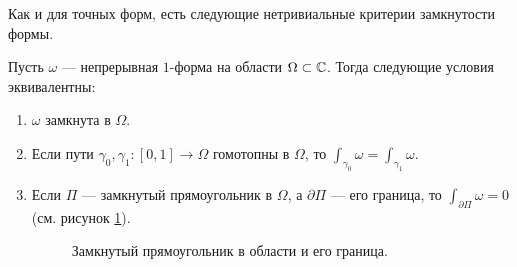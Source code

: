 \documentclass[../complex-analysis.tex]{subfiles}
\begin{document}
Как и для точных форм, есть следующие нетривиальные критерии замкнутости формы.

\begin{thm}
 \label{theorem:closed_1_form}
 Пусть $\omega$ --- непрерывная $1$-форма на области $\Omega \subset \mathbb{C}$. Тогда следующие условия эквивалентны:
 \begin{enumerate}
  \item \label{enum1:theorem:closed_1_form} $\omega$ замкнута в $\Omega$.
  \item \label{enum2:theorem:closed_1_form} Если пути $\gamma_0, \gamma_1 \colon [0,1] \to \Omega$ гомотопны в $\Omega$, то $\int_{\gamma_0} \omega = \int_{\gamma_1} \omega $.
  \item \label{enum3:theorem:closed_1_form} Если $\Pi$ --- замкнутый прямоугольник в $\Omega$, а $\partial \Pi$ --- его граница, то $\int_{\partial \Pi} \omega = 0$ (см. рисунок \ref{fig:closed-rectangle-and-its-border}).
   \begin{figure}[ht]
    \centering
    \caption{Замкнутый прямоугольник в области и его граница.}
    \label{fig:closed-rectangle-and-its-border}
   \end{figure}
 \end{enumerate}
\end{thm}
\end{document}
